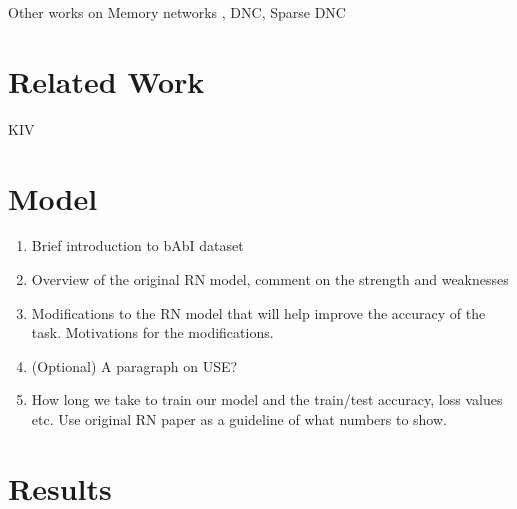 \documentclass{article}
\begin{document}
Other works on Memory networks \cite{Weston2015a}, DNC, Sparse DNC


%
%









\section{Related Work}
KIV

\section{Model}
\begin{enumerate}
\item Brief introduction to bAbI dataset
\item Overview of the original RN model, comment on the strength and weaknesses
\item Modifications to the RN model that will help improve the accuracy of the task. Motivations for the modifications.
\item (Optional) A paragraph on USE?

\item How long we take to train our model and the train/test accuracy, loss values etc. Use original RN paper as a guideline of what numbers to show.

\end{enumerate}


\section{Results}
\end{document}
